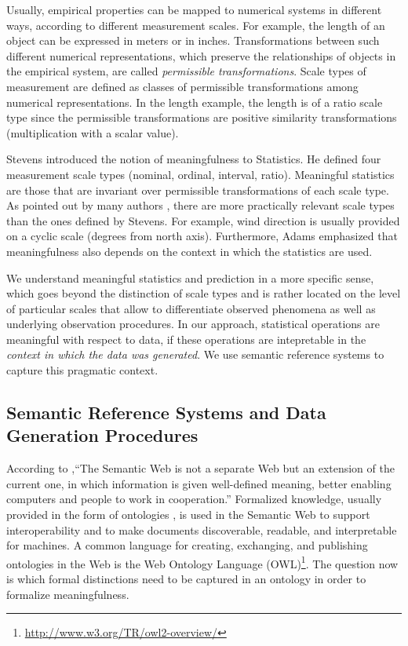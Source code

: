 \documentclass[final,authoryear,1p,times]{elsarticle}
\begin{document}
Usually, empirical properties can be mapped to numerical systems in different ways, according to different measurement scales. For example, the length of an object can be expressed in meters or in inches. Transformations between such different numerical representations, which preserve the relationships of objects in the empirical system, are called \textit{permissible transformations}. Scale types of measurement are defined as classes of permissible transformations among numerical representations. In the length example, the length is of a ratio scale type since the permissible transformations are positive similarity transformations (multiplication with a scalar value).  

Stevens \citep{Stevens1946} introduced the notion of meaningfulness to Statistics. He defined four measurement scale types (nominal, ordinal, interval, ratio). Meaningful statistics are those that are invariant over permissible transformations of each scale type. As pointed out by many authors \citep{Chrisman1995,Suppes1967}, there are more practically relevant scale types than the ones defined by Stevens. For example, wind direction is usually provided on a cyclic scale (degrees from north axis). Furthermore, Adams \citep{Adams1966} emphasized that meaningfulness also depends on the context in which the statistics are used. 

We understand meaningful statistics and prediction in a more specific sense, which goes beyond the distinction of scale types and is rather located on the level of particular scales that allow to differentiate observed phenomena as well as underlying observation procedures. In our approach, statistical operations are meaningful with respect to data, if these operations are intepretable in the \textit{context in which the data was generated}. We use semantic reference systems to capture this pragmatic context.

\subsection{Semantic Reference Systems and Data Generation Procedures}
\label{semRefSystems}

According to \cite[p.35]{Berners-Lee2001},``The Semantic Web is not a separate Web but an extension of the current one, in which information is given well-defined meaning, better enabling computers and people to work in cooperation.'' Formalized knowledge, usually provided in the form of ontologies \citep{Gruber1993}, is used in the Semantic Web to support interoperability and to make documents discoverable, readable, and interpretable for machines. A common language for creating, exchanging, and publishing ontologies in the Web is the Web Ontology Language (OWL)\footnote{\url{http://www.w3.org/TR/owl2-overview/}}. The question now is which formal distinctions need to be captured in an ontology in order to formalize meaningfulness.  
\end{document}

